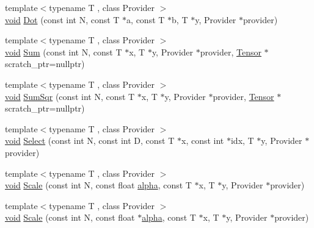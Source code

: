 \begin{DoxyCompactItemize}
\item 
{\footnotesize template$<$typename T , class Provider $>$ }\\\mbox{\hyperlink{mlasi_8h_a88f941d423cb2a819b70a1358982b1a6}{void}} \mbox{\hyperlink{namespaceonnxruntime_1_1math_aa9e9d17c9121e72bf192b4f8f2f32e85}{Dot}} (const int N, const T $\ast$a, const T $\ast$b, T $\ast$y, Provider $\ast$provider)
\item 
{\footnotesize template$<$typename T , class Provider $>$ }\\\mbox{\hyperlink{mlasi_8h_a88f941d423cb2a819b70a1358982b1a6}{void}} \mbox{\hyperlink{namespaceonnxruntime_1_1math_a45bafaac4b994fa6ad36bcf735f05674}{Sum}} (const int N, const T $\ast$x, T $\ast$y, Provider $\ast$provider, \mbox{\hyperlink{classonnxruntime_1_1Tensor}{Tensor}} $\ast$scratch\+\_\+ptr=nullptr)
\item 
{\footnotesize template$<$typename T , class Provider $>$ }\\\mbox{\hyperlink{mlasi_8h_a88f941d423cb2a819b70a1358982b1a6}{void}} \mbox{\hyperlink{namespaceonnxruntime_1_1math_a12689bd88fd703f49d1a2d0002bdf515}{Sum\+Sqr}} (const int N, const T $\ast$x, T $\ast$y, Provider $\ast$provider, \mbox{\hyperlink{classonnxruntime_1_1Tensor}{Tensor}} $\ast$scratch\+\_\+ptr=nullptr)
\item 
{\footnotesize template$<$typename T , class Provider $>$ }\\\mbox{\hyperlink{mlasi_8h_a88f941d423cb2a819b70a1358982b1a6}{void}} \mbox{\hyperlink{namespaceonnxruntime_1_1math_a942b4be2e0b3bcd1582319fa45f0121c}{Select}} (const int N, const int D, const T $\ast$x, const int $\ast$idx, T $\ast$y, Provider $\ast$provider)
\item 
{\footnotesize template$<$typename T , class Provider $>$ }\\\mbox{\hyperlink{mlasi_8h_a88f941d423cb2a819b70a1358982b1a6}{void}} \mbox{\hyperlink{namespaceonnxruntime_1_1math_a44a64e166d586dc38223073f901a46f6}{Scale}} (const int N, const float \mbox{\hyperlink{mlasi_8h_a1763355f32e1812e5cb3a0080e7cca12}{alpha}}, const T $\ast$x, T $\ast$y, Provider $\ast$provider)
\item 
{\footnotesize template$<$typename T , class Provider $>$ }\\\mbox{\hyperlink{mlasi_8h_a88f941d423cb2a819b70a1358982b1a6}{void}} \mbox{\hyperlink{namespaceonnxruntime_1_1math_a7078112ac4cc580d30d9bd68577cd853}{Scale}} (const int N, const float $\ast$\mbox{\hyperlink{mlasi_8h_a1763355f32e1812e5cb3a0080e7cca12}{alpha}}, const T $\ast$x, T $\ast$y, Provider $\ast$provider)

\end{DoxyCompactItemize}
